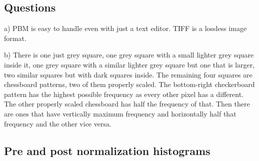 \documentclass{article}
\begin{document}

\pagebreak
\subsection{Questions}
a) PBM is easy to handle even with just a text editor. TIFF is a lossless image format.

b) There is one just grey square, one grey square with a small lighter grey square inside it, one grey square with a similar lighter grey square but one that is larger, two similar squares but with dark squares inside. The remaining four squares are chessboard patterns, two of them properly scaled. The bottom-right checkerboard pattern has the highest possible frequency as every other pixel has a different. The other properly scaled chessboard has half the frequency of that. Then there are ones that have vertically maximum frequency and horizontally half that frequency and the other vice versa.
\pagebreak

\subsection{Pre and post normalization histograms}
\end{document}
